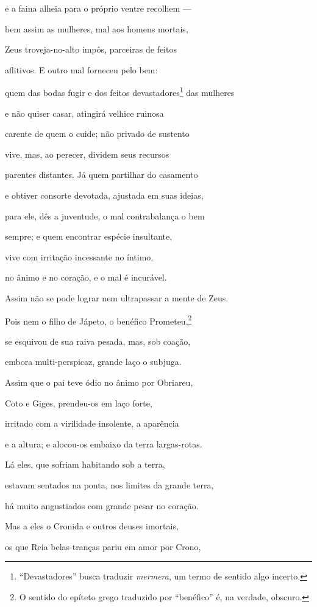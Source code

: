 \begin{pages}
\begin{Rightside}
e a faina alheia para o próprio ventre recolhem ---

bem assim as mulheres, mal aos homens mortais, 

Zeus troveja-no-alto impôs, parceiras de feitos

aflitivos. E outro mal forneceu pelo bem:

quem das bodas fugir e dos feitos devastadores\footnote{``Devastadores'' busca traduzir \emph{mermera}, um termo de sentido algo incerto.} das mulheres

e não quiser casar, atingirá velhice ruinosa

carente de quem o cuide; não privado de sustento 

vive, mas, ao perecer, dividem seus recursos

parentes distantes. Já quem partilhar do casamento

e obtiver consorte devotada, ajustada em suas ideias,

para ele, dês a juventude, o mal contrabalança o bem

sempre; e quem encontrar espécie insultante, 

vive com irritação incessante no íntimo,

no ânimo e no coração, e o mal é incurável.

\quad{}Assim não se pode lograr nem ultrapassar a mente de Zeus.

Pois nem o filho de Jápeto, o benéfico Prometeu,\footnote{O sentido do epíteto grego traduzido por ``benéfico'' é, na verdade, obscuro.}

se esquivou de sua raiva pesada, mas, sob coação, 

embora multi-perspicaz, grande laço o subjuga.

\medskip

Assim que o pai teve ódio no ânimo por Obriareu,

Coto e Giges, prendeu-os em laço forte,

irritado com a virilidade insolente, a aparência

e a altura; e alocou-os embaixo da terra largas-rotas. 

Lá eles, que sofriam habitando sob a terra,

estavam sentados na ponta, nos limites da grande terra,

há muito angustiados com grande pesar no coração.

Mas a eles o Cronida e outros deuses imortais,

os que Reia belas-tranças pariu em amor por Crono, 


\end{Rightside}
\end{pages}

